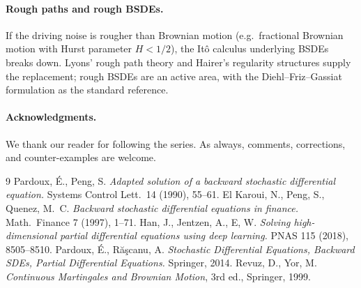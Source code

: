 \documentclass{article}
\begin{document}
\paragraph{Rough paths and rough BSDEs.} If the driving noise is rougher than Brownian motion (e.g.\ fractional Brownian motion with Hurst parameter $H < 1/2$), the It\^o calculus underlying BSDEs breaks down. Lyons' rough path theory and Hairer's regularity structures supply the replacement; rough BSDEs are an active area, with the Diehl--Friz--Gassiat formulation as the standard reference.

\paragraph{Acknowledgments.} We thank our reader for following the series. As always, comments, corrections, and counter-examples are welcome.

\begin{thebibliography}{9}
 Pardoux, \'E., Peng, S. \emph{Adapted solution of a backward stochastic differential equation.} Systems Control Lett.\ 14 (1990), 55--61.
 El Karoui, N., Peng, S., Quenez, M.~C. \emph{Backward stochastic differential equations in finance.} Math.\ Finance 7 (1997), 1--71.
 Han, J., Jentzen, A., E, W. \emph{Solving high-dimensional partial differential equations using deep learning.} PNAS 115 (2018), 8505--8510.
 Pardoux, \'E., R\u{a}\c{s}canu, A. \emph{Stochastic Differential Equations, Backward SDEs, Partial Differential Equations.} Springer, 2014.
 Revuz, D., Yor, M. \emph{Continuous Martingales and Brownian Motion}, 3rd ed., Springer, 1999.
\end{thebibliography}
\end{document}
